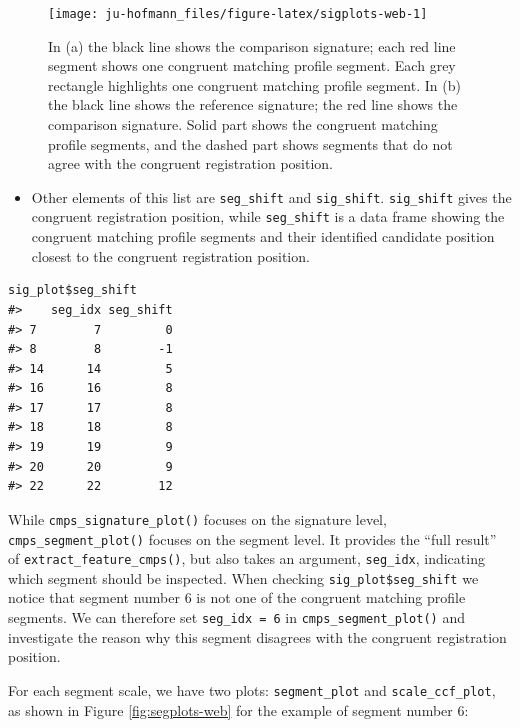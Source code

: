 \begin{figure}

{\centering \texttt{[image: ju-hofmann\_files/figure-latex/sigplots-web-1]} 

}

\caption{In (a) the black line shows the comparison signature; each red line segment shows one congruent matching profile segment. Each grey rectangle highlights one congruent matching profile segment. In (b) the black line shows the reference signature; the red line shows the comparison signature. Solid part shows the congruent matching profile segments, and the dashed part shows segments that do not agree with the congruent registration position.}\label{fig:sigplots-web}
\end{figure}

\begin{itemize}
\tightlist
\item
  Other elements of this list are \texttt{seg\_shift} and \texttt{sig\_shift}. \texttt{sig\_shift} gives the congruent registration position, while \texttt{seg\_shift} is a data frame showing the congruent matching profile segments and their identified candidate position closest to the congruent registration position.
\end{itemize}

\begin{verbatim}
sig_plot$seg_shift
#>    seg_idx seg_shift
#> 7        7         0
#> 8        8        -1
#> 14      14         5
#> 16      16         8
#> 17      17         8
#> 18      18         8
#> 19      19         9
#> 20      20         9
#> 22      22        12
\end{verbatim}

While \texttt{cmps\_signature\_plot()} focuses on the signature level, \texttt{cmps\_segment\_plot()} focuses on the segment level.
It provides the ``full result'' of \texttt{extract\_feature\_cmps()}, but also takes an argument, \texttt{seg\_idx}, indicating which segment should be inspected.
When checking \texttt{sig\_plot\$seg\_shift} we notice that segment number 6 is not one of the congruent matching profile segments.
We can therefore set \texttt{seg\_idx\ =\ 6} in \texttt{cmps\_segment\_plot()} and investigate the reason why this segment disagrees with the congruent registration position.

For each segment scale, we have two plots: \texttt{segment\_plot} and \texttt{scale\_ccf\_plot}, as shown in Figure \ref{fig:segplots-web} for the example of segment number 6:

